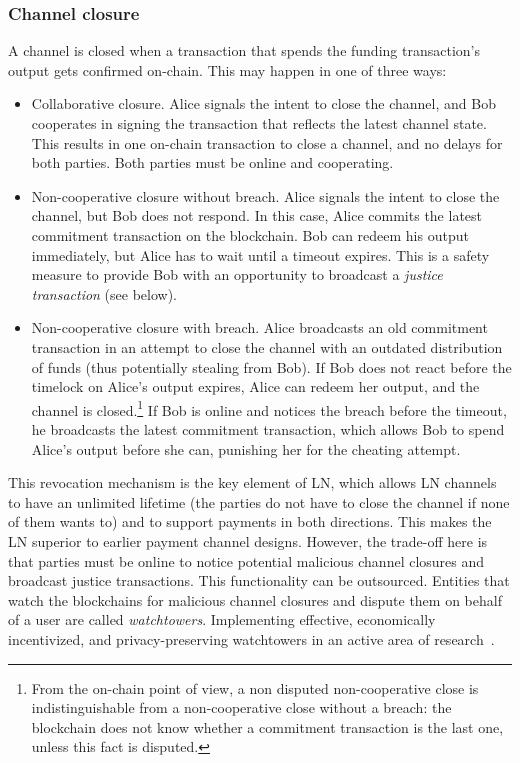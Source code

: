 \subsubsection*{Channel closure}

A channel is closed when a transaction that spends the funding transaction's output gets confirmed on-chain.
This may happen in one of three ways:

\begin{itemize}
	\item Collaborative closure. Alice signals the intent to close the channel, and Bob cooperates in signing the transaction that reflects the latest channel state. This results in one on-chain transaction to close a channel, and no delays for both parties. Both parties must be online and cooperating.
	\item Non-cooperative closure without breach. Alice signals the intent to close the channel, but Bob does not respond. In this case, Alice commits the latest commitment transaction on the blockchain. Bob can redeem his output immediately, but Alice has to wait until a timeout expires. This is a safety measure to provide Bob with an opportunity to broadcast a \textit{justice transaction} (see below).
	\item Non-cooperative closure with breach. Alice broadcasts an old commitment transaction in an attempt to close the channel with an outdated distribution of funds (thus potentially stealing from Bob). If Bob does not react before the timelock on Alice's output expires, Alice can redeem her output, and the channel is closed.\footnote{From the on-chain point of view, a non disputed non-cooperative close is indistinguishable from a non-cooperative close without a breach: the blockchain does not know whether a commitment transaction is the last one, unless this fact is disputed.} If Bob is online and notices the breach before the timeout, he broadcasts the latest commitment transaction, which allows Bob to spend Alice's output before she can, punishing her for the cheating attempt.
\end{itemize}

This revocation mechanism is the key element of LN, which allows LN channels to have an unlimited lifetime (the parties do not have to close the channel if none of them wants to) and to support payments in both directions.
This makes the LN superior to earlier payment channel designs.
However, the trade-off here is that parties must be online to notice potential malicious channel closures and broadcast justice transactions.
This functionality can be outsourced.
Entities that watch the blockchains for malicious channel closures and dispute them on behalf of a user are called \textit{watchtowers}.
Implementing effective, economically incentivized, and privacy-preserving watchtowers in an active area of research~\cite{McCorry2019}.

